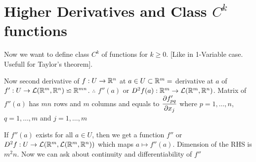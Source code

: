 \section{Higher Derivatives and Class \texorpdfstring{$C^k$}{Ck} functions}
Now we want to define class $C^k$  of functions for $k\geq 0$. [Like in 1-Variable case. Usefull for Taylor's theorem].

Now second derivative of $f:U\to\mathbb{R}^n$ at $a\in U\subset\mathbb{R}^m =$ derivative at $a$ of $f':U\to \mathcal{L}(\mathbb{R}^m,\mathbb{R}^n)\backsimeq \mathbb{R}^{mn}$. $\therefore$ $f''(a)$ or $D^2f(a):\mathbb{R}^m\to \mathcal{L}(\mathbb{R}^m,\mathbb{R}^n)$. Matrix of $f''(a)$ has $mn$ rows and $m$ columns and equals to $\dfrac{\partial f'_{pq}}{\partial x_j}$ where $p=1,\dots,n$, $q=1,\dots, m$ and $j=1,\dots, m$


If $f''(a)$ exists for all $a\in U$, then  we get a  function $f''$ or $D^2f:U\to \mathcal{L}(\mathbb{R}^m,\mathcal{L}(\mathbb{R}^m,\mathbb{R}^n))$ which maps $a\mapsto f''(a)$. Dimension of the RHS is $m^2n$. Now we can ask about continuity and differentiability of $f''$


